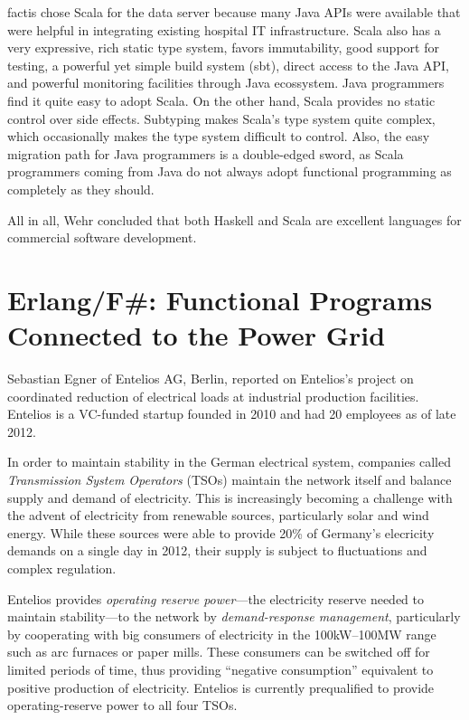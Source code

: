 \documentclass{jfp1}
\begin{document}
factis chose Scala for the data server because many Java APIs were
available that were helpful in integrating existing hospital IT
infrastructure.  Scala also has a very expressive, rich static type
system, favors immutability, good support for testing, a powerful yet
simple build system (sbt), direct access to the Java API, and powerful
monitoring facilities through Java ecossystem.  Java programmers find
it quite easy to adopt Scala.  On the other hand, Scala provides no
static control over side effects.  Subtyping makes Scala's type system
quite complex, which occasionally makes the type system difficult to
control.  Also, the easy migration path for Java programmers is a
double-edged sword, as Scala programmers coming from Java do not
always adopt functional programming as completely as they should.

All in all, Wehr concluded that both Haskell and Scala are excellent
languages for commercial software development.

\section{Erlang/F\#: Functional Programs Connected to the Power Grid}

Sebastian Egner of Entelios AG, Berlin, reported on Entelios's project
on coordinated reduction of electrical loads at industrial production
facilities.  Entelios is a VC-funded startup founded in 2010 and
had 20 employees as of late 2012.

In order to maintain stability in the German electrical system,
companies called
\textit{Transmission System Operators} (TSOs) maintain the network
itself and balance supply and demand of electricity.
This is increasingly becoming a challenge with the advent of
electricity from renewable sources, particularly solar and wind
energy.  While these sources were able to provide 20\% of Germany's
elecricity demands on a single day in 2012, their supply is subject to
fluctuations and complex regulation.

Entelios provides \textit{operating reserve power}---the electricity
reserve needed to maintain stability---to the network by
\textit{demand-response management}, particularly by cooperating with
big consumers of electricity in the 100kW--100MW range such as arc
furnaces or paper mills.  These consumers can be switched off for
limited periods of time, thus providing ``negative consumption''
equivalent to positive production of electricity.  Entelios is
currently prequalified to provide operating-reserve power to all four
TSOs.
\end{document}
